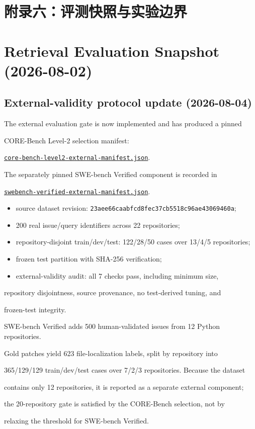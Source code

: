 \documentclass[UTF8,12pt,openany]{ctexbook}
\begin{document}
\chapter{附录六：评测快照与实验边界}

\clearpage
\chapter{Retrieval Evaluation Snapshot (2026-08-02)}

\section{External-validity protocol update (2026-08-04)}

The external evaluation gate is now implemented and has produced a pinned\par
CORE-Bench Level-2 selection manifest:\par
\href{core-bench-level2-external-manifest.json}{\texttt{core-bench-level2-external-manifest.json}}.\par
The separately pinned SWE-bench Verified component is recorded in\par
\href{swebench-verified-external-manifest.json}{\texttt{swebench-verified-external-manifest.json}}.\par

\begin{itemize}
\item source dataset revision: \texttt{23aee66caabfcd8fec37cb5518c96ae43069460a};
\item 200 real issue/query identifiers across 22 repositories;
\item repository-disjoint train/dev/test: 122/28/50 cases over 13/4/5 repositories;
\item frozen test partition with SHA-256 verification;
\item external-validity audit: all 7 checks pass, including minimum size,
\end{itemize}
  repository disjointness, source provenance, no test-derived tuning, and\par
  frozen-test integrity.\par

SWE-bench Verified adds 500 human-validated issues from 12 Python repositories.\par
Gold patches yield 623 file-localization labels, split by repository into\par
365/129/129 train/dev/test cases over 7/2/3 repositories. Because the dataset\par
contains only 12 repositories, it is reported as a separate external component;\par
the 20-repository gate is satisfied by the CORE-Bench selection, not by\par
relaxing the threshold for SWE-bench Verified.\par
\end{document}
